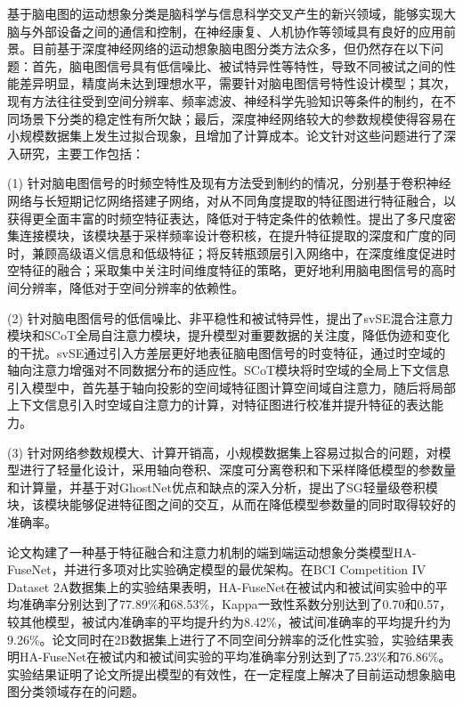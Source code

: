
基于脑电图的运动想象分类是脑科学与信息科学交叉产生的新兴领域，能够实现大脑与外部设备之间的通信和控制，在神经康复、人机协作等领域具有良好的应用前景。目前基于深度神经网络的运动想象脑电图分类方法众多，但仍然存在以下问题：首先，脑电图信号具有低信噪比、被试特异性等特性，导致不同被试之间的性能差异明显，精度尚未达到理想水平，需要针对脑电图信号特性设计模型；其次，现有方法往往受到空间分辨率、频率滤波、神经科学先验知识等条件的制约，在不同场景下分类的稳定性有所欠缺；最后，深度神经网络较大的参数规模使得容易在小规模数据集上发生过拟合现象，且增加了计算成本。论文针对这些问题进行了深入研究，主要工作包括：

(1) 针对脑电图信号的时频空特性及现有方法受到制约的情况，分别基于卷积神经网络与长短期记忆网络搭建子网络，对从不同角度提取的特征图进行特征融合，以获得更全面丰富的时频空特征表达，降低对于特定条件的依赖性。提出了多尺度密集连接模块，该模块基于采样频率设计卷积核，在提升特征提取的深度和广度的同时，兼顾高级语义信息和低级特征；将反转瓶颈层引入网络中，在深度维度促进时空特征的融合；采取集中关注时间维度特征的策略，更好地利用脑电图信号的高时间分辨率，降低对于空间分辨率的依赖性。

(2) 针对脑电图信号的低信噪比、非平稳性和被试特异性，提出了svSE混合注意力模块和SCoT全局自注意力模块，提升模型对重要数据的关注度，降低伪迹和变化的干扰。svSE通过引入方差层更好地表征脑电图信号的时变特征，通过时空域的轴向注意力增强对不同数据分布的适应性。SCoT模块将时空域的全局上下文信息引入模型中，首先基于轴向投影的空间域特征图计算空间域自注意力，随后将局部上下文信息引入时空域自注意力的计算，对特征图进行校准并提升特征的表达能力。

(3) 针对网络参数规模大、计算开销高，小规模数据集上容易过拟合的问题，对模型进行了轻量化设计，采用轴向卷积、深度可分离卷积和下采样降低模型的参数量和计算量，并基于对GhostNet优点和缺点的深入分析，提出了SG轻量级卷积模块，该模块能够促进特征图之间的交互，从而在降低模型参数量的同时取得较好的准确率。

论文构建了一种基于特征融合和注意力机制的端到端运动想象分类模型HA-FuseNet，并进行多项对比实验确定模型的最优架构。在BCI Competition IV Dataset 2A数据集上的实验结果表明，HA-FuseNet在被试内和被试间实验中的平均准确率分别达到了77.89\%和68.53\%，Kappa一致性系数分别达到了0.70和0.57，较其他模型，被试内准确率的平均提升约为8.42\%，被试间准确率的平均提升约为9.26\%。论文同时在2B数据集上进行了不同空间分辨率的泛化性实验，实验结果表明HA-FuseNet在被试内和被试间实验的平均准确率分别达到了75.23\%和76.86\%。实验结果证明了论文所提出模型的有效性，在一定程度上解决了目前运动想象脑电图分类领域存在的问题。